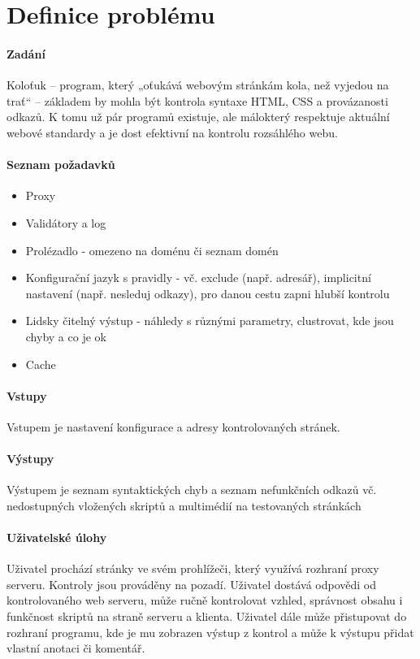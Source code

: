 \documentclass[10pt]{article}
\begin{document}
	\section{Definice probl\'emu}
	\paragraph{Zad\'an\'i}
	Koloťuk – program, který „oťukává webovým stránkám kola, než vyjedou na trať“ – základem by mohla být kontrola syntaxe HTML, CSS a provázanosti odkazů. K tomu už pár programů existuje, ale málokterý respektuje aktuální webové standardy a je dost efektivní na kontrolu rozsáhlého webu. 
	\paragraph{Seznam po\v{z}adavk\r{u}}
	\begin{itemize}
		\item Proxy
		\item Valid\'atory a log
		\item Prol\'ezadlo - omezeno na doménu či seznam domén
		\item Konfigura\v{c}n\'i jazyk s pravidly - vč. exclude (např. adresář), implicitní nastavení (např. nesleduj odkazy), pro danou cestu zapni hlubší kontrolu
		\item Lidsky \v{c}iteln\'y v\'ystup - náhledy s různými parametry, clustrovat, kde jsou chyby a co je ok
		\item Cache
	\end{itemize}
	\paragraph{Vstupy} Vstupem je nastaven\'i konfigurace a adresy kontrolovan\'ych str\'anek.
	\paragraph{V\'ystupy} V\'ystupem je seznam syntaktick\'ych chyb a seznam nefunk\v{c}n\'ich odkaz\r{u} v\v{c}. nedostupn\'ych vlo\v{z}en\'ych skript\r{u} a multim\'edi\'i na testovan\'ych str\'ank\'ach
	\paragraph{U\v{z}ivatelsk\'e \'ulohy} U\v{z}ivatel proch\'az\'i str\'anky ve sv\'em prohl\'i\v{z}e\v{c}i, kter\'y vyu\v{z}\'iv\'a rozhran\'i proxy serveru. Kontroly jsou prov\'ad\v{e}ny na pozad\'i. U\v{z}ivatel dost\'av\'a odpov\v{e}di od kontrolovan\'eho web serveru, m\r{u}\v{z}e ru\v{c}n\v{e} kontrolovat vzhled, spr\'avnost obsahu i funk\v{c}nost skript\r{u} na stran\v{e} serveru a klienta. U\v{z}ivatel d\'ale m\r{u}\v{z}e p\v{r}istupovat do rozhran\'i programu, kde je mu zobrazen v\'ystup z kontrol a může k výstupu přidat vlastní anotaci či komentář.
\end{document}
